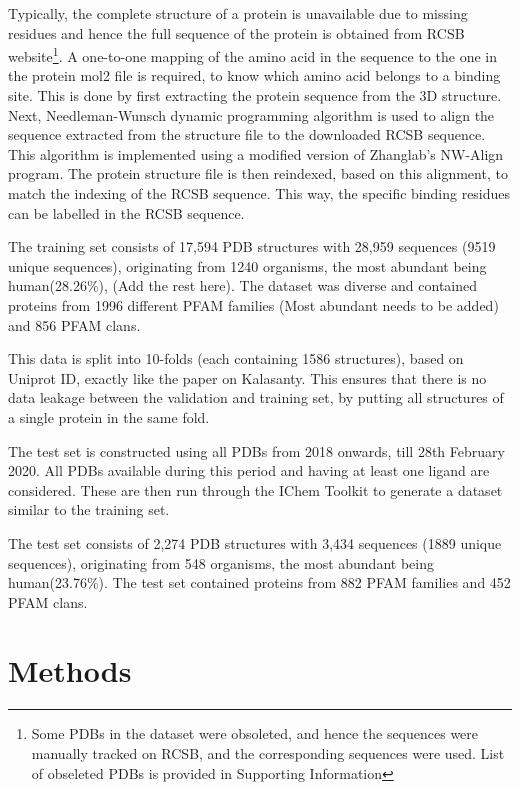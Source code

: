 \documentclass[journal=jacsat,manuscript=article]{achemso}
\begin{document}
Typically, the complete structure of a protein is unavailable due to missing residues and hence the full sequence of the protein is obtained from RCSB \cite{burley2019rcsb} website\footnote{Some PDBs in the dataset were obsoleted, and hence the sequences were manually tracked on RCSB, and the corresponding sequences were used. List of obseleted PDBs is provided in Supporting Information}. A one-to-one mapping of the amino acid in the sequence to the one in the protein mol2 file is required, to know which amino acid belongs to a binding site. This is done by first extracting the protein sequence from the 3D structure. Next, Needleman-Wunsch dynamic programming algorithm is used to align the sequence extracted from the structure file to the downloaded RCSB sequence. This algorithm is implemented using a modified version of Zhanglab's NW-Align program\cite{NWAlign}. The protein structure file is then reindexed, based on this alignment, to match the indexing of the RCSB sequence. This way, the specific binding residues can be labelled in the RCSB sequence.


The training set consists of 17,594 PDB structures with 28,959 sequences (9519 unique sequences), originating from 1240 organisms, the most abundant being human(28.26\%), (Add the rest here). The dataset was diverse and contained proteins from 1996 different PFAM families (Most abundant needs to be added) and 856 PFAM clans.

This data is split into 10-folds (each containing 1586 structures), based on Uniprot ID, exactly like the paper on Kalasanty\cite{stepniewska2020improving}. This ensures that there is no data leakage between the validation and training set, by putting all structures of a single protein in the same fold.

The test set is constructed using all PDBs from 2018 onwards, till 28th February 2020. All PDBs available during this period and having at least one ligand are considered. These are then run through the IChem Toolkit \cite{da2018ichem} to generate a dataset similar to the training set.

The test set consists of 2,274 PDB structures with 3,434 sequences (1889 unique sequences), originating from 548 organisms, the most abundant being human(23.76\%). The test set contained proteins from 882 PFAM families and 452 PFAM clans.


\section{Methods}
\end{document}
